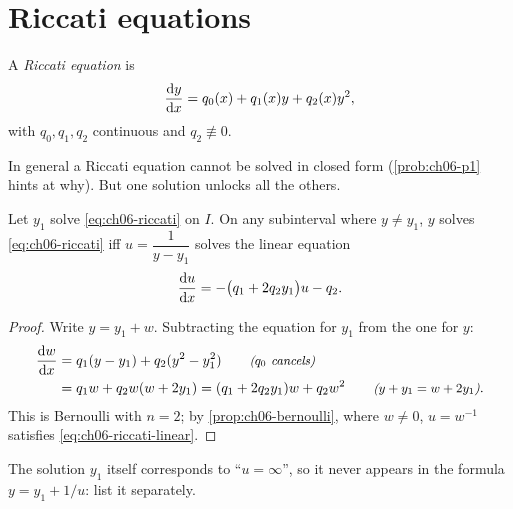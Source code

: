 \section{Riccati equations}\label{sec:ch06-riccati}

\begin{definition}\label{def:ch06-riccati}
A \emph{Riccati equation} is
\begin{equation}\label{eq:ch06-riccati}
  \frac{\mathrm{d}y}{\mathrm{d}x} = q_0(x) + q_1(x)y + q_2(x)y^2,
\end{equation}
with $q_0,q_1,q_2$ continuous and $q_2\not\equiv0$.
\end{definition}

In general a Riccati equation cannot be solved in closed form
(\cref{prob:ch06-p1} hints at why). But one solution unlocks all the others.

\begin{theorem}\label{thm:ch06-riccati}
Let $y_1$ solve \eqref{eq:ch06-riccati} on $I$. On any subinterval where
$y\neq y_1$, $y$ solves \eqref{eq:ch06-riccati} iff $u = \dfrac{1}{y - y_1}$
solves the linear equation
\begin{equation}\label{eq:ch06-riccati-linear}
  \frac{\mathrm{d}u}{\mathrm{d}x} = -\bigl(q_1 + 2q_2y_1\bigr)u - q_2 .
\end{equation}
\end{theorem}
\begin{proof}
Write $y = y_1 + w$. Subtracting the equation for $y_1$ from the one for $y$:
\begin{align*}
  \frac{\mathrm{d}w}{\mathrm{d}x} &= q_1(y - y_1) + q_2(y^2 - y_1^2) \qquad\text{\small\itshape($q_0$ cancels)}\\
             &= q_1w + q_2w(w + 2y_1) = (q_1 + 2q_2y_1)w + q_2w^2
     \qquad\text{\small\itshape($y + y_1 = w + 2y_1$)}.
\end{align*}
This is Bernoulli with $n = 2$; by \cref{prop:ch06-bernoulli}, where $w\neq0$,
$u = w^{-1}$ satisfies \eqref{eq:ch06-riccati-linear}.
\end{proof}

The solution $y_1$ itself corresponds to ``$u = \infty$'', so it never appears
in the formula $y = y_1 + 1/u$: list it separately.

